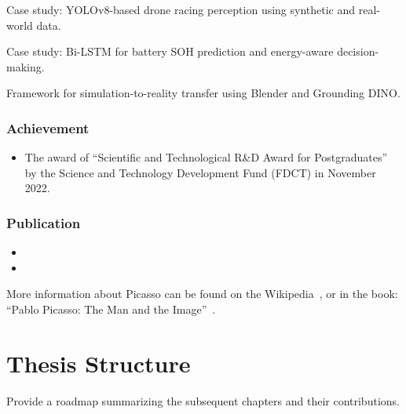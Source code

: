 Case study: YOLOv8-based drone racing perception using synthetic and real-world data.

Case study: Bi-LSTM for battery SOH prediction and energy-aware decision-making.

Framework for simulation-to-reality transfer using Blender and Grounding DINO.


\subsubsection{Achievement}

\begin{itemize}
	\item The award of ``Scientific and Technological R\&D Award for Postgraduates'' by the Science and Technology Development Fund (\gls{FDCT}) in November 2022.
\end{itemize}

\subsubsection{Publication}

\begin{itemize}\sloppy\emergencystretch=1em
	\item {}
	\item {}
\end{itemize}

More information about Picasso can be found on the Wikipedia~\cite{picasso1881wiki}, or in the book: ``Pablo Picasso: The Man and the Image''~\cite{lyttle1989pablo}.


\section{Thesis Structure}

Provide a roadmap summarizing the subsequent chapters and their contributions.

\endinput